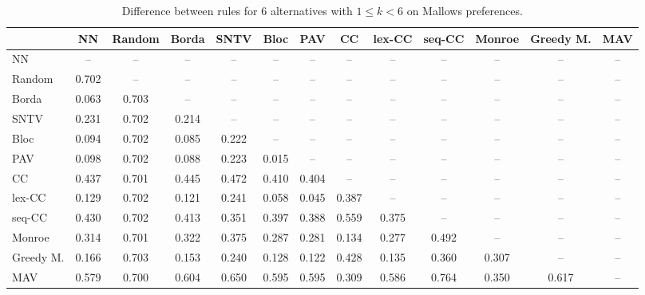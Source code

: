 
\begin{table*}[h!]
\centering
\begin{tabular}{lcccccccccccc}
\toprule
 & NN & Random & Borda & SNTV & Bloc & PAV & CC & lex-CC & seq-CC & Monroe & Greedy M. & MAV \\
\midrule
NN & -- & -- & -- & -- & -- & -- & -- & -- & -- & -- & -- & -- \\
Random & 0.702 & -- & -- & -- & -- & -- & -- & -- & -- & -- & -- & -- \\
Borda & 0.063 & 0.703 & -- & -- & -- & -- & -- & -- & -- & -- & -- & -- \\
SNTV & 0.231 & 0.702 & 0.214 & -- & -- & -- & -- & -- & -- & -- & -- & -- \\
Bloc & 0.094 & 0.702 & 0.085 & 0.222 & -- & -- & -- & -- & -- & -- & -- & -- \\
PAV & 0.098 & 0.702 & 0.088 & 0.223 & 0.015 & -- & -- & -- & -- & -- & -- & -- \\
CC & 0.437 & 0.701 & 0.445 & 0.472 & 0.410 & 0.404 & -- & -- & -- & -- & -- & -- \\
lex-CC & 0.129 & 0.702 & 0.121 & 0.241 & 0.058 & 0.045 & 0.387 & -- & -- & -- & -- & -- \\
seq-CC & 0.430 & 0.702 & 0.413 & 0.351 & 0.397 & 0.388 & 0.559 & 0.375 & -- & -- & -- & -- \\
Monroe & 0.314 & 0.701 & 0.322 & 0.375 & 0.287 & 0.281 & 0.134 & 0.277 & 0.492 & -- & -- & -- \\
Greedy M. & 0.166 & 0.703 & 0.153 & 0.240 & 0.128 & 0.122 & 0.428 & 0.135 & 0.360 & 0.307 & -- & -- \\
MAV & 0.579 & 0.700 & 0.604 & 0.650 & 0.595 & 0.595 & 0.309 & 0.586 & 0.764 & 0.350 & 0.617 & -- \\
\bottomrule
\end{tabular}

\caption{Difference between rules for 6 alternatives with $1 \leq k < 6$ on Mallows preferences.}
\end{table*}
